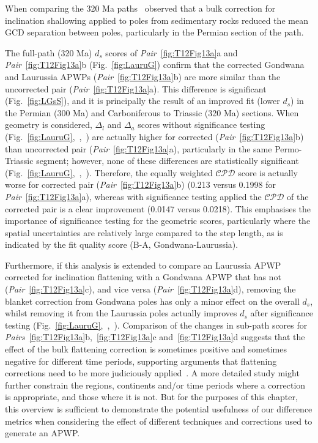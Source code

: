 When comparing the 320 Ma paths~\cite[in their Figure 13(a)]{T12}
observed that a bulk correction for inclination shallowing applied to poles from
sedimentary rocks reduced the mean GCD separation between poles, particularly in
the Permian section of the path.

The full-path (320 Ma) $d_s$ scores of
\emph{Pair}~\ref{fig:T12Fig13a}a and \emph{Pair}~\ref{fig:T12Fig13a}b
(Fig.~\ref{fig:LauruG}) confirm that the corrected Gondwana and Laurussia
APWPs (\emph{Pair}~\ref{fig:T12Fig13a}b) are more similar than the uncorrected
pair (\emph{Pair}~\ref{fig:T12Fig13a}a). This difference is significant
(Fig.~\ref{fig:LGsS}), and it is principally the result of an improved fit
(lower $d_s$) in the Permian (300 Ma) and Carboniferous to
Triassic (320 Ma) sections. When geometry is considered,
$\Delta_l$ and $\Delta_a$ scores without significance testing
(Fig.~\ref{fig:LauruG},~,~) are actually higher
for corrected (\emph{Pair}~\ref{fig:T12Fig13a}b) than uncorrected pair
(\emph{Pair}~\ref{fig:T12Fig13a}a), particularly in the same Permo-Triassic
segment; however, none of these differences are statistically significant
(Fig.~\ref{fig:LauruG},~,~). Therefore, the
equally weighted $\mathcal{CPD}$ score is actually worse for corrected pair
(\emph{Pair}~\ref{fig:T12Fig13a}b) (0.213 versus 0.1998 for
\emph{Pair}~\ref{fig:T12Fig13a}a), whereas with significance testing applied the
$\mathcal{CPD}$ of the corrected pair is a clear improvement (0.0147 versus
0.0218). This emphasises the importance of significance testing for the
geometric scores, particularly where the spatial uncertainties are relatively
large compared to the step length, as is indicated by the fit quality score
(B-A, Gondwana-Laurussia).

Furthermore, if this analysis is extended to compare an Laurussia APWP corrected
for inclination flattening with a Gondwana APWP that has not
(\emph{Pair}~\ref{fig:T12Fig13a}c), and vice versa
(\emph{Pair}~\ref{fig:T12Fig13a}d), removing the blanket correction from
Gondwana poles has only a minor effect on the overall $d_s$, whilst removing it
from the Laurussia poles actually improves $d_s$ after significance testing
(Fig.~\ref{fig:LauruG},~,~). Comparison of the changes in
sub-path scores for \emph{Pairs}~\ref{fig:T12Fig13a}b,~\ref{fig:T12Fig13a}c
and~\ref{fig:T12Fig13a}d suggests that the effect of the bulk flattening
correction is sometimes positive and sometimes negative for different time
periods, supporting arguments that flattening corrections need to be more
judiciously applied~\cite[for example]{B10,B16}. A more detailed study might
further constrain the regions, continents and/or time periods where a correction
is appropriate, and those where it is not. But for the purposes of this chapter,
this overview is sufficient to demonstrate the potential usefulness of our
difference metrics when considering the effect of different techniques and
corrections used to generate an APWP\@.

